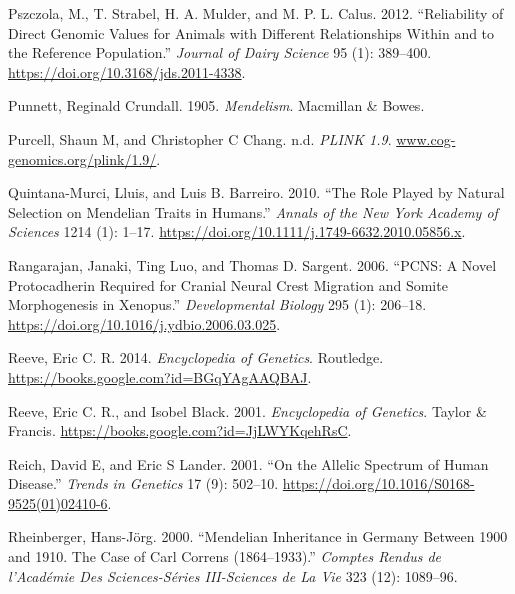 \documentclass[
]{book}
\newlength{\cslhangindent}
\newlength{\cslentryspacingunit} %
\newenvironment{CSLReferences}[2] %
 {%
  \setlength{\parindent}{0pt}
  \ifodd #1
  \let\oldpar\par
  \def\par{\hangindent=\cslhangindent\oldpar}
  \fi
  \setlength{\parskip}{#2\cslentryspacingunit}
 }%
 {}
\begin{document}
\begin{CSLReferences}{1}{0}
\leavevmode{}%
Pszczola, M., T. Strabel, H. A. Mulder, and M. P. L. Calus. 2012. {``Reliability of Direct Genomic Values for Animals with Different Relationships Within and to the Reference Population.''} \emph{Journal of Dairy Science} 95 (1): 389--400. \url{https://doi.org/10.3168/jds.2011-4338}.

\leavevmode{}%
Punnett, Reginald Crundall. 1905. \emph{Mendelism}. {Macmillan \& Bowes}.

\leavevmode{}%
Purcell, Shaun M, and Christopher C Chang. n.d. \emph{{PLINK} 1.9}. \href{https://www.cog-genomics.org/plink/1.9/}{www.cog-genomics.org/plink/1.9/}.

\leavevmode{}%
Quintana-Murci, Lluis, and Luis B. Barreiro. 2010. {``The Role Played by Natural Selection on {Mendelian} Traits in Humans.''} \emph{Annals of the New York Academy of Sciences} 1214 (1): 1--17. \url{https://doi.org/10.1111/j.1749-6632.2010.05856.x}.

\leavevmode{}%
Rangarajan, Janaki, Ting Luo, and Thomas D. Sargent. 2006. {``{PCNS}: {A} Novel Protocadherin Required for Cranial Neural Crest Migration and Somite Morphogenesis in {Xenopus}.''} \emph{Developmental Biology} 295 (1): 206--18. \url{https://doi.org/10.1016/j.ydbio.2006.03.025}.

\leavevmode{}%
Reeve, Eric C. R. 2014. \emph{Encyclopedia of {Genetics}}. {Routledge}. \url{https://books.google.com?id=BGqYAgAAQBAJ}.

\leavevmode{}%
Reeve, Eric C. R., and Isobel Black. 2001. \emph{Encyclopedia of {Genetics}}. {Taylor \& Francis}. \url{https://books.google.com?id=JjLWYKqehRsC}.

\leavevmode{}%
Reich, David E, and Eric S Lander. 2001. {``On the Allelic Spectrum of Human Disease.''} \emph{Trends in Genetics} 17 (9): 502--10. \url{https://doi.org/10.1016/S0168-9525(01)02410-6}.

\leavevmode{}%
Rheinberger, Hans-Jörg. 2000. {``Mendelian Inheritance in {Germany} Between 1900 and 1910. {The} Case of {Carl Correns} (1864--1933).''} \emph{Comptes Rendus de l'Académie Des Sciences-Séries III-Sciences de La Vie} 323 (12): 1089--96.


\end{CSLReferences}
\end{document}
